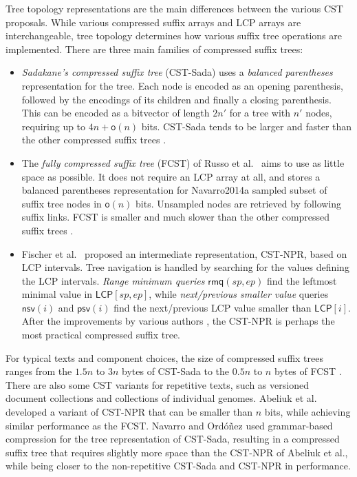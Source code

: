 \documentclass[a4paper,11pt]{llncs}
\newcommand{\CST}{\textsf{CST}}
\newcommand{\CSTsada}{\textsf{CST\nobreakdash-Sada}}
\newcommand{\FCST}{\textsf{FCST}}
\newcommand{\CSTnpr}{\textsf{CST\nobreakdash-NPR}}
\newcommand{\LCP}{\textsf{LCP}}
\newcommand{\mLCP}{\ensuremath{\mathsf{LCP}}}
\newcommand{\mpsv}{\ensuremath{\mathsf{psv}}}
\newcommand{\mnsv}{\ensuremath{\mathsf{nsv}}}
\newcommand{\mrmq}{\ensuremath{\mathsf{rmq}}}
\newcommand{\oh}{\ensuremath{\mathsf{o}}}
\begin{document}
Tree topology representations are the main differences between the various \CST{} proposals. While various compressed suffix arrays and \LCP{} arrays are interchangeable, tree topology determines how various suffix tree operations are implemented. There are three main families of compressed suffix trees:
\begin{itemize}
\item \emph{Sadakane's compressed suffix tree} (\CSTsada) \cite{Sadakane2007} uses a \emph{balanced parentheses} representation for the tree. Each node is encoded as an opening parenthesis, followed by the encodings of its children and finally a closing parenthesis. This can be encoded as a bitvector of length $2n'$ for a tree with $n'$ nodes, requiring up to $4n+\oh(n)$ bits. \CSTsada{} tends to be larger and faster than the other compressed suffix trees \cite{Gog2011a,Abeliuk2013}.
\item The \emph{fully compressed suffix tree} (\FCST) of Russo et al.~\cite{Russo2011,Navarro2014a} aims to use as little space as possible. It does not require an \LCP{} array at all, and stores a balanced parentheses representation for Navarro2014a sampled subset of suffix tree nodes in $\oh(n)$ bits. Unsampled nodes are retrieved by following suffix links. \FCST{} is smaller and much slower than the other compressed suffix trees \cite{Russo2011,Abeliuk2013}.
\item Fischer et al.~\cite{Fischer2009a} proposed an intermediate representation, \CSTnpr, based on \LCP{} intervals. Tree navigation is handled by searching for the values defining the \LCP{} intervals. \emph{Range minimum queries} $\mrmq(sp,ep)$ find the leftmost minimal value in $\mLCP[sp,ep]$, while \emph{next/previous smaller value} queries $\mnsv(i)$ and $\mpsv(i)$ find the next/previous \LCP{} value smaller than $\mLCP[i]$. After the improvements by various authors \cite{Ohlebusch2009,Ohlebusch2010,Gog2011a,Abeliuk2013}, the \CSTnpr{} is perhaps the most practical compressed suffix tree.
\end{itemize}

For typical texts and component choices, the size of compressed suffix trees ranges from the $1.5n$ to $3n$ bytes of \CSTsada{} to the $0.5n$ to $n$ bytes of \FCST{} \cite{Gog2011a,Abeliuk2013}. There are also some \CST{} variants for repetitive texts, such as versioned document collections and collections of individual genomes. Abeliuk et al.~\cite{Abeliuk2013} developed a variant of \CSTnpr{} that can be smaller than $n$ bits, while achieving similar performance as the \FCST. Navarro and Ordóñez \cite{Navarro2014} used grammar-based compression for the tree representation of \CSTsada, resulting in a compressed suffix tree that requires slightly more space than the \CSTnpr{} of Abeliuk et al., while being closer to the non-repetitive \CSTsada{} and \CSTnpr{} in performance.
\end{document}
